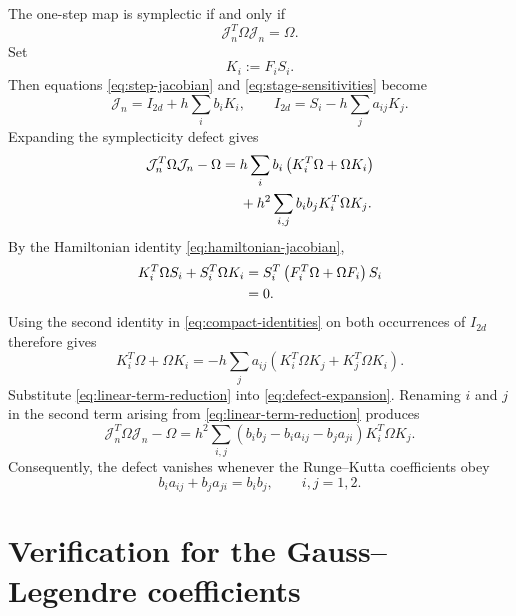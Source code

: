 \documentclass[11pt,a4paper]{article}
\newcommand{\Id}{I}
\newcommand{\Om}{\Omega}
\newcommand{\Jn}{\mathcal{J}_n}
\begin{document}
The one-step map is symplectic if and only if
\begin{equation}
 \Jn^T\Om\Jn=\Om.
 \label{eq:symplectic-condition}
\end{equation}
Set
\begin{equation}
 K_i:=F_iS_i.
 \label{eq:Ki}
\end{equation}
Then equations \eqref{eq:step-jacobian} and
\eqref{eq:stage-sensitivities} become
\begin{equation}
 \Jn=\Id_{2d}+h\sum_i b_iK_i,
 \qquad
 \Id_{2d}=S_i-h\sum_j a_{ij}K_j.
 \label{eq:compact-identities}
\end{equation}
Expanding the symplecticity defect gives
\begin{align}
 \Jn^T\Om\Jn-\Om
 ={}&h\sum_i b_i\left(K_i^T\Om+\Om K_i\right)
 \notag\\
 &+h^2\sum_{i,j}b_ib_jK_i^T\Om K_j.
 \label{eq:defect-expansion}
\end{align}
By the Hamiltonian identity \eqref{eq:hamiltonian-jacobian},
\begin{align}
 K_i^T\Om S_i+S_i^T\Om K_i
 &=S_i^T\left(F_i^T\Om+\Om F_i\right)S_i
 \notag\\
 &=0.
 \label{eq:hamiltonian-cancellation}
\end{align}
Using the second identity in \eqref{eq:compact-identities} on both occurrences
of $\Id_{2d}$ therefore gives
\begin{equation}
 K_i^T\Om+\Om K_i
 =-h\sum_j a_{ij}
 \left(K_i^T\Om K_j+K_j^T\Om K_i\right).
 \label{eq:linear-term-reduction}
\end{equation}
Substitute \eqref{eq:linear-term-reduction} into
\eqref{eq:defect-expansion}.  Renaming $i$ and $j$ in the second term arising
from \eqref{eq:linear-term-reduction} produces
\begin{equation}
 \boxed{
 \Jn^T\Om\Jn-\Om
 =h^2\sum_{i,j}
 \left(b_ib_j-b_i a_{ij}-b_j a_{ji}\right)
 K_i^T\Om K_j.
 }
 \label{eq:rk-symplecticity-defect}
\end{equation}
Consequently, the defect vanishes whenever the Runge--Kutta coefficients obey
\begin{equation}
 \boxed{
 b_i a_{ij}+b_j a_{ji}=b_ib_j,
 \qquad i,j=1,2.
 }
 \label{eq:rk-symplecticity-condition}
\end{equation}

\clearpage

\section{Verification for the Gauss--Legendre coefficients}
\end{document}
